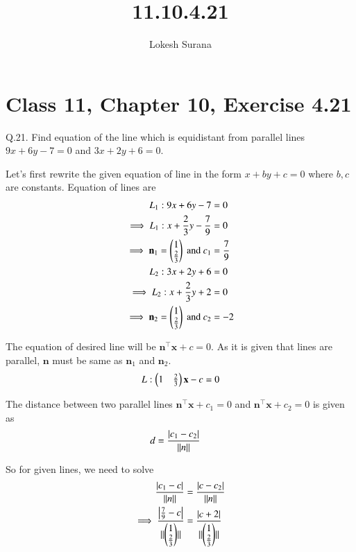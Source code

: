 \documentclass[journal,12pt,twocolumn]{IEEEtran}
\renewcommand{\vec}[1]{\boldsymbol{\mathbf{#1}}}
\begin{document}
\vspace{3cm}
\title{11.10.4.21}
\author{Lokesh Surana}
\maketitle
\section*{Class 11, Chapter 10, Exercise 4.21}

Q.21. Find equation of the line which is equidistant from parallel lines $9{x} + 6{y} - 7 = 0$ and $3{x} + 2{y} + 6 = 0$.

\solution Let's first rewrite the given equation of line in the form $x + by + c = 0$ where $b, c$ are constants.
Equation of lines are
\begin{align}
    {L}_1: 9{x} + 6{y} - 7 &= 0\\
    \implies {L}_1: {x} + \frac{2}{3}{y} - \frac{7}{9} &= 0\\
    \implies \vec{n}_1 = \myvec{1\\\frac{2}{3}} \text{ and } {c}_1 &= \frac{7}{9}\\
    {L}_2: 3{x} + 2{y} + 6 &= 0 \\
    \implies {L}_2: {x} + \frac{2}{3}{y} + 2 &= 0\\
    \implies \vec{n}_2 = \myvec{1\\\frac{2}{3}} \text{ and } {c}_2 &= -2
\end{align}

The equation of desired line will be $\vec{n}^{\top}\vec{x} + c = 0$.
As it is given that lines are parallel, $\vec{n}$ must be same as $\vec{n}_1$ and $\vec{n}_2$.
\begin{align}
	{L}: \myvec{1&\frac{2}{3}}\vec{x} - c = 0
\end{align}

The distance between two parallel lines $\vec{n}^{\top}\vec{x} + {c}_1 = 0$ and $\vec{n}^{\top}\vec{x} + {c}_2 = 0$ is given as
\begin{align}
	{d} &= \frac{\left\vert{c}_1 - {c}_2\right\vert}{\lVert n\rVert}
\end{align}

So for given lines, we need to solve
\begin{align}
	\frac{\left\vert{c}_1 - {c}\right\vert}{\lVert n\rVert} &= \frac{\left\vert{c}-{c}_2\right\vert}{\lVert n\rVert}\\
	\implies \frac{\left\vert\frac{7}{9} - {c}\right\vert}{\lVert\begin{pmatrix}1\\\frac{2}{3}\end{pmatrix}\rVert} &= \frac{\left\vert{c} + 2\right\vert}{\lVert\begin{pmatrix}1\\\frac{2}{3}\end{pmatrix}\rVert}
\end{align}
\end{document}

